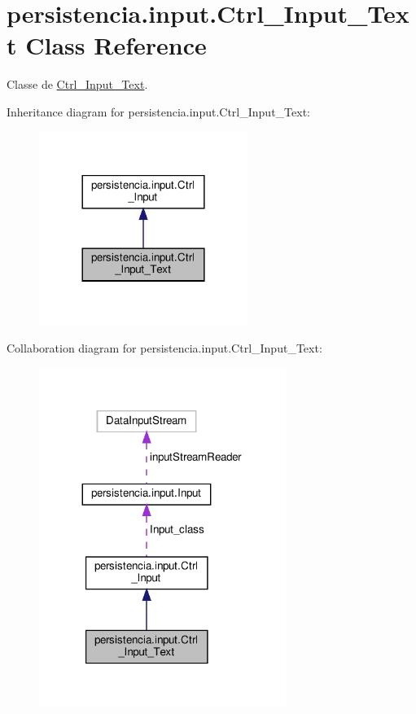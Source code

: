 \hypertarget{classpersistencia_1_1input_1_1Ctrl__Input__Text}{}\section{persistencia.\+input.\+Ctrl\+\_\+\+Input\+\_\+\+Text Class Reference}
\label{classpersistencia_1_1input_1_1Ctrl__Input__Text}


Classe de \hyperlink{classpersistencia_1_1input_1_1Ctrl__Input__Text}{Ctrl\+\_\+\+Input\+\_\+\+Text}.  




Inheritance diagram for persistencia.\+input.\+Ctrl\+\_\+\+Input\+\_\+\+Text\+:\nopagebreak
\begin{figure}[H]
\begin{center}
\leavevmode
\includegraphics[width=192pt]{classpersistencia_1_1input_1_1Ctrl__Input__Text__inherit__graph}
\end{center}
\end{figure}


Collaboration diagram for persistencia.\+input.\+Ctrl\+\_\+\+Input\+\_\+\+Text\+:\nopagebreak
\begin{figure}[H]
\begin{center}
\leavevmode
\includegraphics[width=227pt]{classpersistencia_1_1input_1_1Ctrl__Input__Text__coll__graph}
\end{center}
\end{figure}
